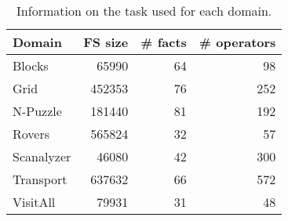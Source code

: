 \begin{table}[htb]
\centering
\caption{Information on the task used for each domain.} 
\vspace{\baselineskip}
\begin{tabular}{lrrr}
\toprule
Domain     & FS size  & \# facts & \# operators \\ \midrule
Blocks     & 65990    & 64       & 98           \\
Grid       & 452353   & 76       & 252          \\
N-Puzzle   & 181440   & 81       & 192          \\
Rovers     & 565824   & 32       & 57           \\
Scanalyzer & 46080    & 42       & 300          \\
Transport  & 637632   & 66       & 572          \\
VisitAll   & 79931    & 31       & 48           \\ \bottomrule
\end{tabular}
\label{tab:tasks_info}
\end{table}
